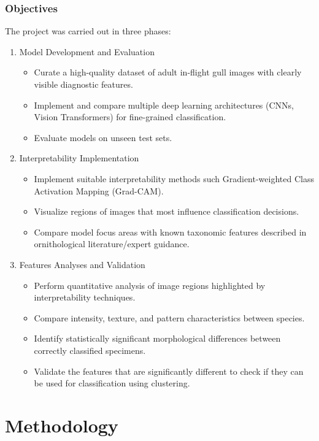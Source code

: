 \documentclass[a4paper,12pt]{report}
\begin{document}
\subsection{Objectives}
The project was carried out in three phases:
\begin{enumerate}
    \item Model Development and Evaluation
        \begin{itemize}
            \item Curate a high-quality dataset of adult in-flight gull images with clearly visible diagnostic features.
            \item Implement and compare multiple deep learning architectures (CNNs, Vision Transformers) for fine-grained classification.
            \item Evaluate models on unseen test sets.
        \end{itemize}
    \item Interpretability Implementation
        \begin{itemize}
            \item Implement suitable interpretability methods such Gradient-weighted Class Activation Mapping (Grad-CAM).
            \item Visualize regions of images that most influence classification decisions.
            \item Compare model focus areas with known taxonomic features described in ornithological literature/expert guidance.
        \end{itemize}
    \item Features Analyses and Validation
        \begin{itemize}
            \item Perform quantitative analysis of image regions highlighted by interpretability techniques.
            \item Compare intensity, texture, and pattern characteristics between species.
            \item Identify statistically significant morphological differences between correctly classified specimens.
            \item Validate the features that are significantly different to check if they can be used for classification using clustering.
        \end{itemize}
\end{enumerate}

\newpage
\chapter{Methodology}
\end{document}
